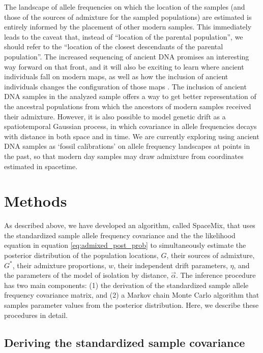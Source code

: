 \documentclass[12pt]{article}
\newcommand{\identifyadmixsource}[1]{{#1^{*}}}
\begin{document}
The landscape of allele frequencies on which the location of the samples 
(and those of the sources of admixture for the sampled populations) 
are estimated is entirely informed by the placement of other modern samples.  
This immediately leads to the caveat that, instead of ``location of the parental population'',
we should refer to the ``location of the closest descendants of the parental population''.
The increased sequencing of ancient DNA \citep[see][for a recent review]{pickrell_reich:14} promises an interesting way forward on that front,
and it will also be exciting to learn where ancient individuals fall on modern maps, 
as well as how the inclusion of ancient individuals changes the configuration of those maps \citep{skoglund_investigating_2014}.
The inclusion of ancient DNA samples in the analyzed sample offers a way to get better representation of the ancestral populations from which the ancestors of modern samples received their admixture.  
However, it is also possible to model genetic drift as a spatiotemporal Gaussian process, 
in which covariance in allele frequencies decays with distance in both space and in time.  
We are currently exploring using ancient DNA samples as  `fossil calibrations' on allele frequency landscapes at points in the past, 
so that modern day samples may draw admixture from coordinates estimated in spacetime.

\newpage

\section*{Methods}
As described above, we have developed an algorithm, called SpaceMix, that uses the standardized sample allele frequency covariance and the the likelihood equation in equation \eqref{eq:admixed_post_prob} to simultaneously estimate the posterior distribution of the population locations, $G$, their sources of admixture, $\identifyadmixsource{G}$, their admixture proportions, $w$, their independent drift parameters, $\eta$, and the parameters of the model of isolation by distance, $\vec{\alpha}$.  The inference procedure has two main components: (1) the derivation of the standardized sample allele frequency covariance matrix, and (2) a Markov chain Monte Carlo algorithm that samples parameter values from the posterior distribution.  Here, we describe these procedures in detail.

\subsection*{Deriving the standardized sample covariance}
\end{document}
